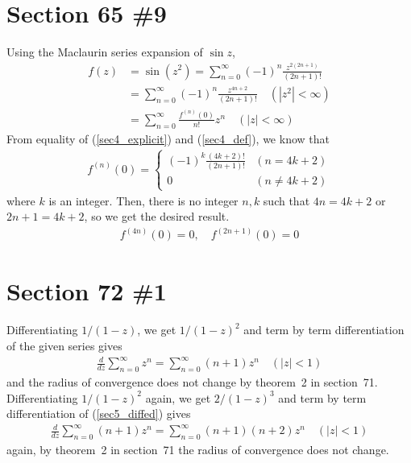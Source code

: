\documentclass{scrartcl}
\begin{document}
\section{Section 65 \#9}
Using the Maclaurin series expansion of \(\sin z\),
\begin{align}
  \nonumber f(z)
  \nonumber &= \sin (z^2)
  \nonumber = \sum^\infty_{n = 0} (-1)^{n} \frac{z^{2(2n + 1)}}{(2n + 1)!} \\
  \label{sec4_explicit} &= \sum^\infty_{n = 0} (-1)^n \frac{z^{4n + 2}}{(2n + 1)!} \quad (|z^2| < \infty) \\
  \label{sec4_def} &= \sum^\infty_{n = 0} \frac{f^{(n)}(0)}{n!} z^n \quad (|z| < \infty)
\end{align}
From equality of (\ref{sec4_explicit}) and (\ref{sec4_def}), we know that
\begin{align*}
  f^{(n)}(0) = \begin{cases}
    (-1)^k \frac{(4k + 2)!}{(2n + 1)!} & (n = 4k + 2) \\
    0 & (n \not = 4k + 2)
  \end{cases}
\end{align*}
where \(k\) is an integer.
Then, there is no integer \(n, k\) such that \(4n = 4k + 2\) or \(2n + 1 = 4k + 2\), so we get the desired result.
\begin{align*}
  f^{(4n)}(0) = 0, \quad f^{(2n + 1)}(0) = 0
\end{align*}

\section{Section 72 \#1}
Differentiating \(1 / (1 - z)\), we get \(1 / (1 - z)^2\) and term by term differentiation of the given series gives
\begin{align}\label{sec5_diffed}
  \frac{d}{dz} \sum^\infty_{n = 0} z^n = \sum^\infty_{n = 0} (n + 1)z^n \quad (|z| < 1)
\end{align}
and the radius of convergence does not change by theorem~2 in section~71.
Differentiating \(1 / (1 - z)^2\) again, we get \(2 / (1 - z)^3\) and term by term differentiation of (\ref{sec5_diffed}) gives
\begin{align*}
  \frac{d}{dz} \sum^\infty_{n = 0} (n + 1)z^n = \sum^\infty_{n = 0} (n + 1)(n + 2)z^n \quad (|z| < 1)
\end{align*}
again, by theorem~2 in section~71 the radius of convergence does not change.
\end{document}
